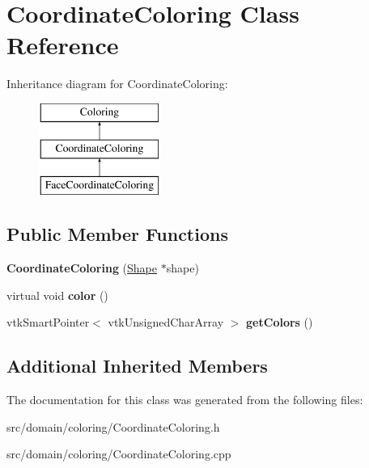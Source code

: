 \hypertarget{class_coordinate_coloring}{}\section{Coordinate\+Coloring Class Reference}
\label{class_coordinate_coloring}
Inheritance diagram for Coordinate\+Coloring\+:\begin{figure}[H]
\begin{center}
\leavevmode
\includegraphics[height=3.000000cm]{class_coordinate_coloring}
\end{center}
\end{figure}
\subsection*{Public Member Functions}
\begin{DoxyCompactItemize}
\item 
\hypertarget{class_coordinate_coloring_ab16ae41e2bac3e484a05a95f8c3c75c8}{}{\bfseries Coordinate\+Coloring} (\hyperlink{class_shape}{Shape} $\ast$shape)\label{class_coordinate_coloring_ab16ae41e2bac3e484a05a95f8c3c75c8}

\item 
\hypertarget{class_coordinate_coloring_adfe81353e9b0791cceb013cc9a4e3f36}{}virtual void {\bfseries color} ()\label{class_coordinate_coloring_adfe81353e9b0791cceb013cc9a4e3f36}

\item 
\hypertarget{class_coordinate_coloring_acded67a88144659e774a09db49f58295}{}vtk\+Smart\+Pointer$<$ vtk\+Unsigned\+Char\+Array $>$ {\bfseries get\+Colors} ()\label{class_coordinate_coloring_acded67a88144659e774a09db49f58295}

\end{DoxyCompactItemize}
\subsection*{Additional Inherited Members}


The documentation for this class was generated from the following files\+:\begin{DoxyCompactItemize}
\item 
src/domain/coloring/Coordinate\+Coloring.\+h\item 
src/domain/coloring/Coordinate\+Coloring.\+cpp\end{DoxyCompactItemize}
